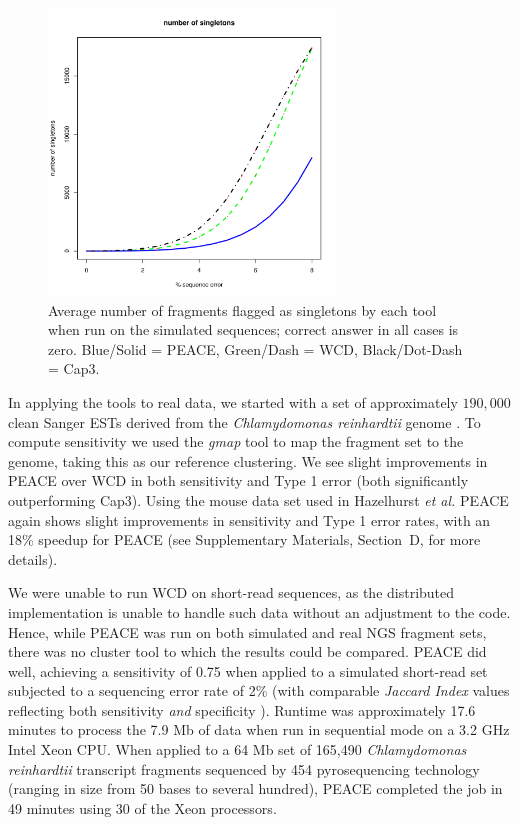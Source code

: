 \documentclass[a4,center,fleqn]{NAR}
\newcommand{\peace} {{\small PEACE}}
\newcommand{\wcd} {{\small WCD}}
\newcommand{\capthree} {{\small Cap3}}
\begin{document}
\begin{figure}
  \centerline{\includegraphics[width=3in]{pics.d/singletons.pdf}}
  \caption{Average number of fragments flagged as singletons by each tool
    when run on the simulated sequences; correct answer in all cases is
    zero.  Blue/Solid = \peace, Green/Dash = \wcd,
    Black/Dot-Dash = \capthree.}\label{singletons}
\end{figure}

In applying the tools to real data, we started with a set of
approximately $190,000$ clean Sanger ESTs derived from the {\it
  Chlamydomonas reinhardtii} genome \cite{Liang2008}.  To compute
sensitivity we used the {\it gmap} tool \cite{Wu05} to map the
fragment set to the genome, taking this as our reference clustering.
We see slight improvements in \peace\/ over \wcd\/ in both sensitivity
and Type 1 error (both significantly outperforming \capthree).  Using
the mouse data set used in Hazelhurst {\it et al.}
\cite{Hazelhurst08a} \peace\/ again shows slight improvements in
sensitivity and Type 1 error rates, with an 18\% speedup for \peace\/ 
(see Supplementary Materials, Section~D, for more details).

We were unable to run \wcd\/ on short-read sequences, as the
distributed implementation is unable to handle such data without an
adjustment to the code.  Hence, while \peace\/ was run on both
simulated and real NGS fragment sets, there was no cluster tool to
which the results could be compared.  \peace\/ did well, achieving a
sensitivity of 0.75 when applied to a simulated short-read set subjected to
a sequencing error rate of 2\% (with comparable {\it Jaccard Index}
values reflecting both sensitivity {\it and} specificity
\cite{Kalyanaraman03,Hazelhurst08a}).  Runtime was approximately 17.6
minutes to process the 7.9 Mb of data when run in sequential mode on a
3.2 GHz Intel Xeon CPU.  When applied to a 64 Mb set of 165,490 {\it
  Chlamydomonas reinhardtii} transcript fragments sequenced by 454
pyrosequencing technology (ranging in size from 50 bases to several
hundred), \peace\/ completed the job in 49 minutes using 30 of the
Xeon processors.
\end{document}
